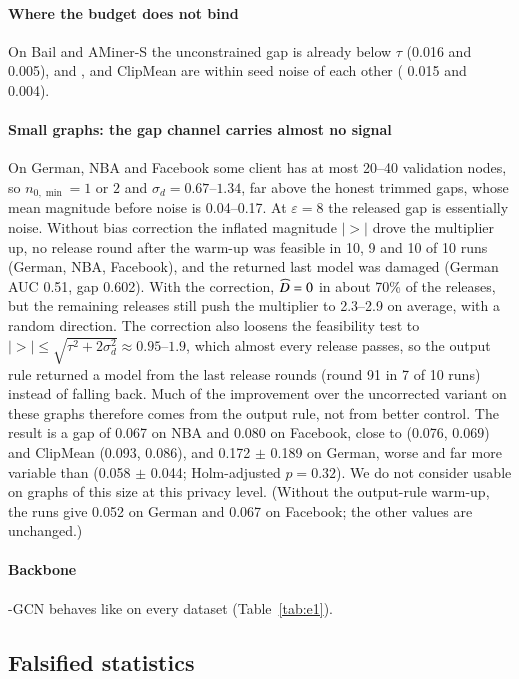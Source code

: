 \paragraph{Where the budget does not bind}
On Bail and AMiner-S the unconstrained gap is already below $\tau$ (0.016 and 0.005), and \rt{}, \clamp{} and ClipMean are within seed noise of each other (\rt{} 0.015 and 0.004).

\paragraph{Small graphs: the gap channel carries almost no signal}
On German, NBA and Facebook some client has at most 20--40 validation nodes, so $n_{0,\min}=1$ or $2$ and $\sigma_d=0.67$--$1.34$, far above the honest trimmed gaps, whose mean magnitude before noise is 0.04--0.17. At $\varepsilon=8$ the released gap is essentially noise. Without bias correction the inflated magnitude $|\gt|$ drove the multiplier up, no release round after the warm-up was feasible in 10, 9 and 10 of 10 runs (German, NBA, Facebook), and the returned last model was damaged (German AUC 0.51, gap 0.602). With the correction, $\widehat{D}=0$ in about 70\% of the releases, but the remaining releases still push the multiplier to 2.3--2.9 on average, with a random direction. The correction also loosens the feasibility test to $|\gt|\le\sqrt{\tau^2+2\sigma_d^2}\approx0.95$--$1.9$, which almost every release passes, so the output rule returned a model from the last release rounds (round 91 in 7 of 10 runs) instead of falling back. Much of the improvement over the uncorrected variant on these graphs therefore comes from the output rule, not from better control. The result is a gap of 0.067 on NBA and 0.080 on Facebook, close to \clamp{} (0.076, 0.069) and ClipMean (0.093, 0.086), and 0.172 $\pm$ 0.189 on German, worse and far more variable than \clamp{} (0.058 $\pm$ 0.044; Holm-adjusted $p=0.32$). We do not consider \rt{} usable on graphs of this size at this privacy level. (Without the output-rule warm-up, the \clamp{} runs give 0.052 on German and 0.067 on Facebook; the other values are unchanged.)

\paragraph{Backbone}
\rt{}-GCN behaves like \rt{} on every dataset (Table~\ref{tab:e1}).

\subsection{Falsified statistics}\label{sec:statattack}

